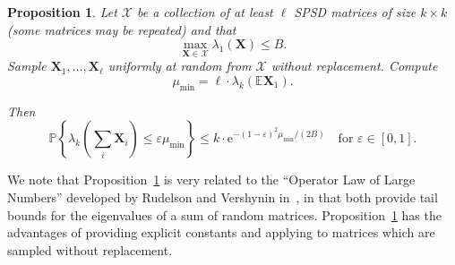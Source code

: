 \documentclass[11pt,letterpaper,twoside,reqno,nosumlimits]{amsart}
\newcommand{\mat}[1]{\ensuremath{\mathbf{#1}}}
\newcommand{\e}{\ensuremath{\mathrm{e}}}
\newcommand{\E}{\ensuremath{\mathbb{E}}}
\newcommand{\Prob}[1]{\ensuremath{\mathbb{P}\left\{#1\right\}}}
\newtheorem{prop}{Proposition}
\theoremstyle{remark}
\begin{document}
\begin{prop}
 Let $\mathcal{X}$ be a collection of at least $\ell$ SPSD matrices of size $k \times k$ (some matrices may be repeated) and that 
\[
 \max_{\mat{X} \in \mathcal{X}} \lambda_1(\mat{X}) \leq B. 
\]
 Sample $\mat{X}_1, \ldots, \mat{X}_\ell$ uniformly at random from $\mathcal{X}$ without replacement. Compute
\[
 \mu_{\text{min}} = \ell \cdot \lambda_k(\E \mat{X}_1).
\]

Then
\[
 \Prob{ \lambda_k\left(\sum_i \mat{X}_i \right) \leq \varepsilon\mu_{\text{min}} } \leq k \cdot \e^{-(1-\varepsilon)^2 \mu_{\text{min}}/(2B)} \quad \text{for } \varepsilon \in [0,1].
\]

 \label{prop:chernoffworeplacement}
\end{prop}

We note that Proposition~\ref{prop:chernoffworeplacement} is very related to the ``Operator Law of Large Numbers'' developed by Rudelson and Vershynin in~\cite{RV07}, in that both provide tail bounds for the eigenvalues of a sum of random matrices. Proposition~\ref{prop:chernoffworeplacement} has the advantages of providing explicit constants and applying to matrices which are sampled without replacement.
\end{document}
